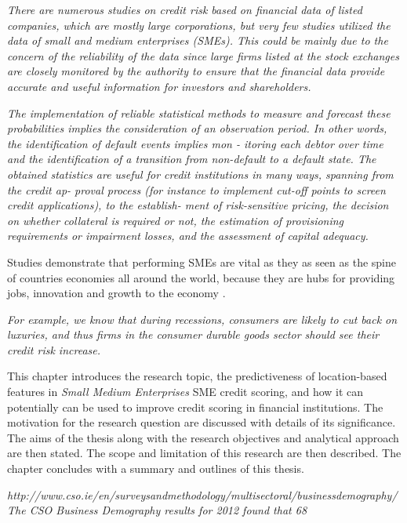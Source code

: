 \textit{There  are  numerous  studies  on  credit 
	risk based on financial data of listed companies, which are mostly 
	large  corporations,  but  very  few  studies  utilized  the  data  of  small 
	and  medium  enterprises  (SMEs).  This  could  be  mainly  due  to  the 
	concern of the reliability of the data since large firms listed at the 
	stock  exchanges  are  closely  monitored  by  the  authority  to  ensure 
	that the financial data provide accurate and useful information for 
	investors and shareholders. \citep{sirirattanaphonkun_default_2012}}

\textit{The
	implementation of reliable statistical methods to measure and forecast these probabilities implies the
	consideration of an observation period. In other words, the identification of default events implies mon
	-
	itoring each debtor over time and the identification of a transition from non-default to a default state.
	The obtained statistics are useful for credit institutions in many ways, spanning from the credit ap-
	proval process (for instance to implement cut-off points to screen credit applications), to the establish-
	ment of risk-sensitive pricing, the decision on whether collateral is required or not, the estimation of
	provisioning requirements or impairment losses, and the assessment of capital adequacy.
	\citep{antunes_estimating_2005}}

Studies demonstrate that performing SMEs are vital as they as seen as the spine of countries economies all around the world, because they are hubs for providing jobs, innovation and growth to the economy \citep{craig_sba-guaranteed_2004}.


\textit{For example, we know that during recessions, consumers
	are likely to cut back on luxuries, and thus firms in the consumer durable goods sector
	should see their credit risk increase. \citep{hackbarth_capital_2006}}

This chapter introduces the research topic, the predictiveness of location-based features in \textit{Small Medium Enterprises} SME credit scoring, and how it can potentially can be used to improve credit scoring in financial institutions. The motivation for the research question are discussed with details of its significance. The aims of the thesis along with the research objectives and analytical approach are then stated. The scope and limitation of this research are then described. The chapter concludes with a summary and outlines of this thesis.

\textit{
http://www.cso.ie/en/surveysandmethodology/multisectoral/businessdemography/
The CSO Business Demography results for 2012 found that 68%
}


